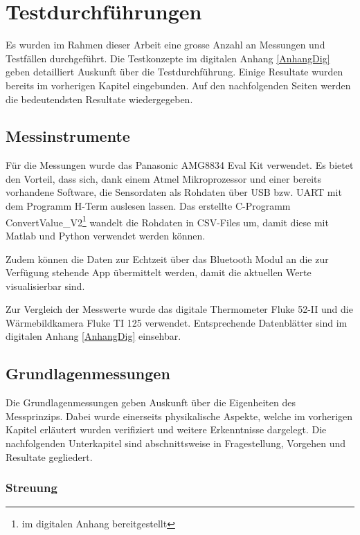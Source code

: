 \chapter{Testdurchführungen}
\label{chap:Testphasen}

Es wurden im Rahmen dieser Arbeit eine grosse Anzahl an Messungen und Testfällen durchgeführt. Die Testkonzepte im digitalen Anhang \ref{AnhangDig} geben detailliert Auskunft über die Testdurchführung. Einige Resultate wurden bereits im vorherigen Kapitel eingebunden. Auf den nachfolgenden Seiten werden die bedeutendsten Resultate wiedergegeben. 

\section{Messinstrumente}

Für die Messungen wurde das Panasonic AMG8834 Eval Kit verwendet. Es bietet den Vorteil, dass sich, dank einem Atmel Mikroprozessor und einer bereits vorhandene Software, die Sensordaten als Rohdaten über USB bzw. \ac{UART} mit dem Programm H-Term auslesen lassen. 
Das erstellte C-Programm ConvertValue\_V2\footnote[12]{im digitalen Anhang bereitgestellt} wandelt die Rohdaten in \ac{CSV}-Files um, damit diese mit Matlab und Python verwendet werden können.

Zudem können die Daten zur Echtzeit über das Bluetooth Modul an die zur Verfügung stehende App übermittelt werden, damit die aktuellen Werte visualisierbar sind.

Zur Vergleich der Messwerte wurde das digitale Thermometer Fluke 52-II und die Wärmebildkamera Fluke TI 125 verwendet. Entsprechende Datenblätter sind im digitalen Anhang \ref{AnhangDig} einsehbar.

\section{Grundlagenmessungen}

Die Grundlagenmessungen geben Auskunft über die Eigenheiten des Messprinzips. Dabei wurde einerseits physikalische Aspekte, welche im vorherigen Kapitel erläutert wurden verifiziert und weitere Erkenntnisse dargelegt. Die nachfolgenden Unterkapitel sind abschnittsweise in Fragestellung, Vorgehen und Resultate gegliedert.

\subsection{Streuung}

